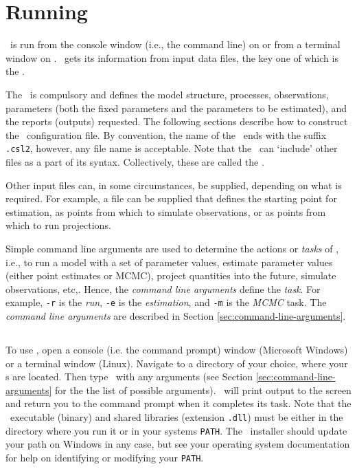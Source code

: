 \section{Running \CNAME\label{sec:running}}

\CNAME\ is run from the console window (i.e., the command line) on  or from a terminal window on . \CNAME\ gets its information from input data files, the key one of which is the \config{}. 

The \config\ is compulsory and defines the model structure, processes, observations, parameters (both the fixed parameters and the parameters to be estimated), and the reports (outputs) requested. The following sections  describe how to construct the \CNAME\ configuration file. By convention, the name of the \config\ ends with the suffix \texttt{.csl2}, however, any file name is acceptable. Note that the \config\ can `include' other files as a part of its syntax. Collectively, these are called the \config.

Other input files can, in some circumstances, be supplied, depending on what is required. For example, a file can be supplied that defines the starting point for estimation, as points from which to simulate observations, or as points from which to run projections.

Simple command line arguments are used to determine the actions or \emph{tasks} of \CNAME, i.e., to run a model with a set of parameter values, estimate parameter values (either point estimates or MCMC), project quantities into the future, simulate observations, etc,. Hence, the \emph{command line arguments} define the \emph{task}. For example, \texttt{-r} is the \emph{run}, \texttt{-e} is the \emph{estimation}, and \texttt{-m} is the \emph{MCMC} task. The \emph{command line arguments} are described in Section \ref{sec:command-line-arguments}.

\subsection{}
To use \CNAME, open a console (i.e. the command prompt) window (Microsoft Windows) or a terminal window (Linux). Navigate to a directory of your choice, where your \config s are located. Then type \cname\ with any arguments (see Section \ref{sec:command-line-arguments} for the the list of possible arguments). \CNAME\ will print output to the screen and return you to the command prompt when it completes its task. Note that the \CNAME\ executable (binary) and shared libraries (extension \texttt{.dll}) must be either in the directory where you run it or in your systems \texttt{PATH}. The \CNAME\ installer should update your path on Windows in any case, but see your operating system documentation for help on identifying or modifying your \texttt{PATH}.

